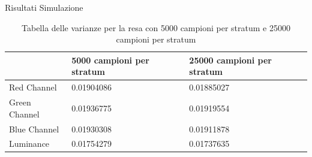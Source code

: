 \documentclass[14pt, aspectratio=169]{beamer}
\theoremstyle{theoremdd}
\begin{document}
\begin{frame}{Risultati Simulazione}
{\begin{table}[tb]
\begin{tabularx}{\linewidth}{XXX}
					& 5000 campioni per stratum & 25000 campioni per stratum \\
					\midrule
					Red Channel					& 0.01904086 & 0.01885027 \\
					Green Channel				& 0.01936775 & 0.01919554 \\
					Blue Channel				& 0.01930308 & 0.01911878 \\
					Luminance					& 0.01754279 & 0.01737635 \\
					\bottomrule
				\end{tabularx}
				\caption{Tabella delle varianze per la resa con 5000 campioni per stratum e 25000 campioni per stratum}
			\end{table}
		}
	\end{frame}
\end{document}
